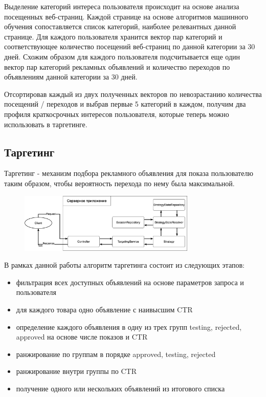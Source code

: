 \documentclass[times]{itmo-student-thesis}
\begin{document}
 Выделение категорий интереса пользователя происходит на основе анализа посещенных веб-страниц. Каждой странице на основе алгоритмов машинного обучения сопоставляется список категорий, наиболее релевантных данной странице. Для каждого пользователя хранится вектор пар категорий и соответствующее количество посещений веб-страниц по данной категории за 30 дней. Схожим образом для каждого пользователя подсчитывается еще один вектор пар категорий рекламных объявлений и количество переходов по объявлениям данной категории за 30 дней.
 
Отсортировав каждый из двух полученных векторов по невозрастанию количества посещений / переходов  и выбрав первые 5 категорий в каждом, получим два профиля краткосрочных интересов пользователя, которые теперь можно использовать в таргетинге.

\subsection{Таргетинг}

Таргетинг - механизм подбора рекламного объявления для показа пользователю таким образом, чтобы вероятность перехода по нему была максимальной.

\begin{figure}[h]
\includegraphics[width=0.75\textwidth]{targeting-process}
\centering
\end{figure}

В рамках данной работы алгоритм таргетинга состоит из следующих этапов:
\begin{itemize}
\item фильтрация всех доступных объявлений на основе параметров запроса и пользователя
\item для каждого товара одно объявление с наивысшим CTR
\item определение каждого объявления в одну из трех групп testing, rejected, approved на основе числе показов и CTR
\item ранжирование по группам в порядке approved, testing, rejected
\item ранжирование внутри группы по CTR
\item получение одного или нескольких объявлений из итогового списка
\end{itemize}
\end{document}
